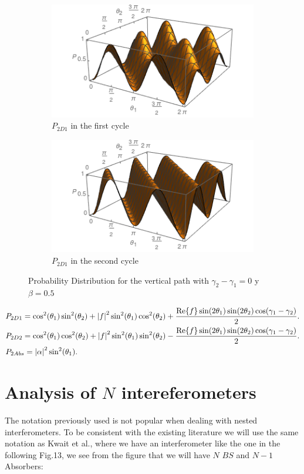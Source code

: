 \documentclass[12pt]{article}
\begin{document}
\begin{figure}[!h]
\begin{subfigure}[b]{0.40\linewidth}
\includegraphics[width=\linewidth,height=3 cm]{images/pcd11.png}
\caption{$P_{2D1} $ in the first cycle}
\label{fig:westminster_aerea}
\end{subfigure}
\begin{subfigure}[b]{0.40\linewidth}
\includegraphics[width=\linewidth,height=3 cm]{images/pcd12.png}
\caption{$P_{2D1} $ in the second cycle }
\label{fig:BS1}
\end{subfigure}
\caption{Probability Distribution for the vertical path with  $\gamma_{2}-\gamma_{1}=0 $ y $\beta=0.5$}
\label{fig:westminster}
\end{figure}

\begin{align}
&P_{2D1}=\cos^2(\theta_{1})\sin^2(\theta_{2})+\abs{f}^2 \sin^2(\theta_{1})\cos^2(\theta_{2})+\frac{\Re{f} \sin(2\theta_{1})\sin(2\theta_{2})\cos(\gamma_{1}-\gamma_{2})}{2}.\\
&P_{2D2}=\cos^2(\theta_{1})\cos^2(\theta_{2})+ \abs{f}^2 \sin^2(\theta_{1})\sin^2(\theta_{2})-\frac{\Re{f} \sin(2\theta_{1})\sin(2\theta_{2})\cos(\gamma_{1}-\gamma_{2})}{2}.\\
&P_{2Abs}=\abs{\alpha}^2 \sin^2(\theta_{1}).
\end{align}



\newpage


\section{Analysis of $N$ intereferometers }
 
 The notation previously used is not popular when dealing with nested interferometers. To be consistent with the existing literature we will use the same notation as Kwait et al.\cite{5}, where we have an interferometer  like the one in the following Fig.13, we see from the figure that we will have $N$ $BS$ and $N-1$ Absorbers:
 
\end{document}
